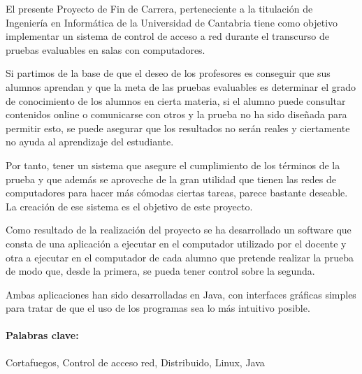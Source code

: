 





El presente Proyecto de Fin de Carrera, perteneciente a la titulación de Ingeniería en Informática de la Universidad de Cantabria tiene como objetivo implementar un sistema de control de acceso a red durante el transcurso de pruebas evaluables en salas con computadores.
\newline

Si partimos de la base de que el deseo de los profesores es conseguir que sus alumnos aprendan y que la meta de las pruebas evaluables es determinar el grado de conocimiento de los alumnos en cierta materia, si el alumno puede consultar contenidos online o comunicarse con otros y la prueba no ha sido diseñada para permitir esto, se puede asegurar que los resultados no serán reales y ciertamente no ayuda al aprendizaje del estudiante.
\newline

Por tanto, tener un sistema que asegure el cumplimiento de los términos de la prueba y que además se aproveche de la gran utilidad que tienen las redes de computadores para hacer más cómodas ciertas tareas, parece bastante deseable. La creación de ese sistema es el objetivo de este proyecto.
\newline

Como resultado de la realización del proyecto se ha desarrollado un software que consta de una aplicación a ejecutar en el computador utilizado por el docente y otra a ejecutar en el computador de cada alumno que pretende realizar la prueba de modo que, desde la primera, se pueda tener control sobre la segunda.
\newline

Ambas aplicaciones han sido desarrolladas en Java, con interfaces gráficas simples para tratar de que el uso de los programas sea lo más intuitivo posible.
\newline

\paragraph{Palabras clave:}
 Cortafuegos, Control de acceso red, Distribuido, Linux, Java

